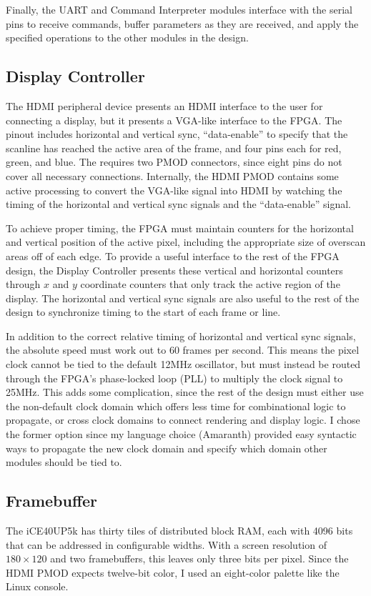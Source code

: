 \documentclass[11pt,conference]{IEEEtran}
\begin{document}
Finally, the UART and Command Interpreter modules interface with the serial pins to receive commands, buffer parameters as they are received, and apply the specified operations to the other modules in the design.

\subsection{Display Controller}
The HDMI peripheral device presents an HDMI interface to the user for connecting a display, but it presents a VGA-like interface to the FPGA\@.
The pinout includes horizontal and vertical sync, ``data-enable'' to specify that the scanline has reached the active area of the frame, and four pins each for red, green, and blue.
The requires two PMOD connectors, since eight pins do not cover all necessary connections.
Internally, the HDMI PMOD contains some active processing to convert the VGA-like signal into HDMI by watching the timing of the horizontal and vertical sync signals and the ``data-enable'' signal.

To achieve proper timing, the FPGA must maintain counters for the horizontal and vertical position of the active pixel, including the appropriate size of overscan areas off of each edge.
To provide a useful interface to the rest of the FPGA design, the Display Controller presents these vertical and horizontal counters through $x$ and $y$ coordinate counters that only track the active region of the display.
The horizontal and vertical sync signals are also useful to the rest of the design to synchronize timing to the start of each frame or line.

In addition to the correct relative timing of horizontal and vertical sync signals, the absolute speed must work out to 60 frames per second.
This means the pixel clock cannot be tied to the default 12MHz oscillator, but must instead be routed through the FPGA's phase-locked loop (PLL) to multiply the clock signal to 25MHz.
This adds some complication, since the rest of the design must either use the non-default clock domain which offers less time for combinational logic to propagate, or cross clock domains to connect rendering and display logic.
I chose the former option since my language choice (Amaranth) provided easy syntactic ways to propagate the new clock domain and specify which domain other modules should be tied to.

\subsection{Framebuffer}
The iCE40UP5k has thirty tiles of distributed block RAM, each with 4096 bits that can be addressed in configurable widths.
With a screen resolution of $180\times120$ and two framebuffers, this leaves only three bits per pixel.
Since the HDMI PMOD expects twelve-bit color, I used an eight-color palette like the Linux console.
\end{document}
